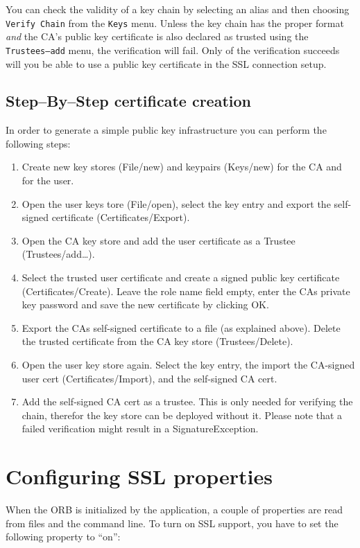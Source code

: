 You can  check the validity of a  key chain by selecting  an alias and
then choosing {\tt Verify Chain}  from the {\tt Keys} menu. Unless the
key  chain  has  the proper  format  {\em  and}  the CA's  public  key
certificate is also declared  as trusted using the {\tt Trustees--add}
menu, the  verification will fail.  Only of  the verification succeeds
will you be able to use a public key certificate in the SSL connection
setup.

\subsection{Step--By--Step certificate creation}
In  order to  generate  a  simple public  key  infrastructure you  can
perform the following steps:
\begin{enumerate}
\item Create new key stores (File/new) and keypairs (Keys/new) for the CA
and for the user.
\item  Open the  user keys tore (File/open),  select the  key  entry and
export the self-signed certificate (Certificates/Export).
\item  Open  the  CA  key store  and  add the  user  certificate  as  a
Trustee (Trustees/add\dots).
\item Select the  trusted user certificate and create  a signed public
key certificate (Certificates/Create). Leave the role name field empty,
enter the  CAs private  key password and  save the new  certificate by
clicking OK.
\item Export the  CAs self-signed certificate to a  file (as explained
above).    Delete    the    trusted    certificate   from    the    CA
key store (Trustees/Delete).
\item Open the  user key store again. Select the  key entry, the import
the CA-signed  user cert (Certificates/Import), and  the self-signed CA
cert.
\item Add  the self-signed CA cert  as a trustee. This  is only needed
for verifying the chain, therefor the key store can be deployed without
it.  Please  note  that  a  failed  verification  might  result  in  a
SignatureException.
\end{enumerate}

\section{Configuring SSL properties}

When the ORB is initialized by the application, a couple of properties
are read from files and the  command line. To turn on SSL support, you have to
set the following property to ``on'':

